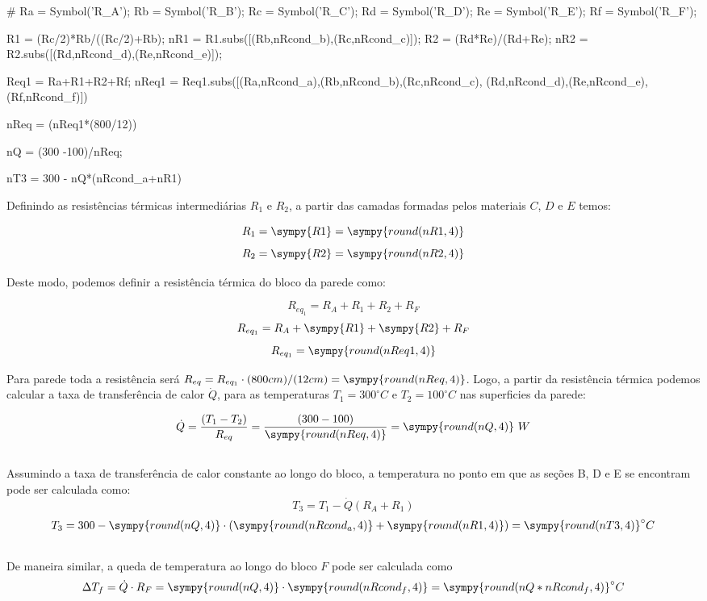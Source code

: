 \documentclass[a4paper,11pt]{article}
\newcommand{\npy}[1]{\sympy{round(n#1,4)}}
\begin{document}
\begin{sympycode}
#
Ra = Symbol('R_A');
Rb = Symbol('R_B');
Rc = Symbol('R_C');
Rd = Symbol('R_D');
Re = Symbol('R_E');
Rf = Symbol('R_F');

R1 = (Rc/2)*Rb/((Rc/2)+Rb);
nR1 = R1.subs([(Rb,nRcond_b),(Rc,nRcond_c)]);
R2 = (Rd*Re)/(Rd+Re);
nR2 = R2.subs([(Rd,nRcond_d),(Re,nRcond_e)]);

Req1 = Ra+R1+R2+Rf;
nReq1 = Req1.subs([(Ra,nRcond_a),(Rb,nRcond_b),(Rc,nRcond_c),
   (Rd,nRcond_d),(Re,nRcond_e),(Rf,nRcond_f)])

nReq = (nReq1*(800/12))

nQ = (300 -100)/nReq;

nT3 = 300 - nQ*(nRcond_a+nR1)
\end{sympycode}

Definindo as resistências térmicas intermediárias $R_1$ e $R_2$, a partir das camadas formadas pelos materiais $C$, $D$ e $E$ temos:

$$R_1 = \sympy{R1} = \npy{R1}$$
$$R_2 = \sympy{R2} = \npy{R2}$$

Deste modo, podemos definir a resistência térmica do bloco da parede como:

$$R_{eq_1} = R_A + R_1 + R_2 + R_F$$
$$R_{eq_1} = R_A + \sympy{R1} + \sympy{R2} + R_F$$
$$R_{eq_1} = \npy{Req1}$$

Para parede toda a resistência será $R_{eq} = R_{eq_1}\cdot (800cm)/(12cm) = \npy{Req}$. Logo, a partir da resistência térmica podemos calcular a taxa de transferência de calor $\dot{Q}$, para as temperaturas $T_1 = 300^\circ C$ e $T_2 = 100^\circ C$ nas superficies da parede:

$$\dot{Q} = \frac{(T_1 - T_2)}{R_{eq}} = \frac{(300 - 100)}{\npy{Req}} = \npy{Q}\ W$$

\subsection{}

Assumindo a taxa de transferência de calor constante ao longo do bloco, a temperatura no ponto em que as seções B, D e E se encontram pode ser calculada como:
$$
T_3 = T_1 - \dot{Q}(R_A + R_1) $$
$$T_3= 300 - \npy{Q}\cdot ( \npy{Rcond_a} + \npy{R1}) = \npy{T3} ^\circ C
$$

\subsection{}
De maneira similar, a queda de temperatura ao longo do bloco $F$ pode ser calculada como
$$
\Delta T_f =  \dot{Q}\cdot R_F = \npy{Q}\cdot \npy{Rcond_f} = \npy{Q*nRcond_f} ^\circ C
$$
\end{document}
